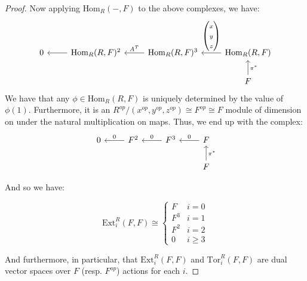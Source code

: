 \documentclass{article}
\newcommand{\Hom}{\text{Hom}}
\newcommand{\Tor}{\text{Tor}}
\newcommand{\Ext}{\text{Ext}}
\begin{document}
\begin{proof}
Now applying $\Hom_{R}(- , F)$ to the above complexes, we have:
\[
\begin{tikzcd}
0 & {\Hom_R(R,F)^2} \arrow[l] & {\Hom_R(R, F)^3} \arrow[l, "A^T"'] & {\Hom_R(R,F)} \arrow[l, "\begin{pmatrix} x \\ y \\ z \end{pmatrix}"'] \\
  &                           &                                    & F \arrow[u, "\pi^*"']                                                
\end{tikzcd}
\]
We have that any $\phi \in \Hom_{R}(R,F)$ is uniquely determined by the value of $\phi(1)$. Furthermore, it is an $R^{op}/(x^{op},y^{op},z^{op}) \cong F^{op} \cong F$ module of dimension on under the natural multiplication on maps.
\newpage
Thus, we end up with the complex:
  \[
  \begin{tikzcd}
0 & F^2 \arrow[l, swap, "0"] & F^3 \arrow[l, swap, "0"] & F  \arrow[l, swap, "0"]\\
            &                    &                    & F \arrow[u, swap, "\pi^{*}"]                
\end{tikzcd}
\]

And so we have:

  \[
  \Ext_{i}^{R}(F,F) \cong
  \begin{cases}
    F & i = 0\\
    F^{3} & i = 1 \\
    F^{2} & i = 2 \\
    0 & i \geq 3 
  \end{cases}
\]

And furthermore, in particular, that $\Ext_{i}^{R}(F,F)$ and $\Tor_{i}^{R}(F,F)$ are dual vector spaces over $F$ (resp. $F^{op}$) actions for each $i$.
\end{proof}
\end{document}
